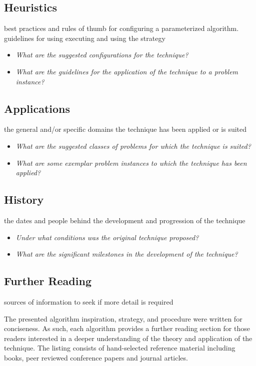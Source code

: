 \documentclass[a4paper, 11pt]{article}
\begin{document}
\subsection{Heuristics}
best practices and rules of thumb for configuring a parameterized algorithm. guidelines for using executing and using the strategy

\begin{itemize}
	\item \emph{What are the suggested configurations for the technique?}
	\item \emph{What are the guidelines for the application of the technique to a problem instance?}
\end{itemize}

\subsection{Applications}
the general and/or specific domains the technique has been applied or is suited

\begin{itemize}
	\item \emph{What are the suggested classes of problems for which the technique is suited?}
	\item \emph{What are some exemplar problem instances to which the technique has been applied?}
\end{itemize}

\subsection{History}
the dates and people behind the development and progression of the technique

\begin{itemize}
	\item \emph{Under what conditions was the original technique proposed?}
	\item \emph{What are the significant milestones in the development of the technique?}
\end{itemize}

\subsection{Further Reading}
sources of information to seek if more detail is required

The presented algorithm inspiration, strategy, and procedure were written for conciseness. As such, each algorithm provides a further reading section for those readers interested in a deeper understanding of the theory and application of the technique. The listing consists of hand-selected reference material including books, peer reviewed conference papers and journal articles.
\end{document}
